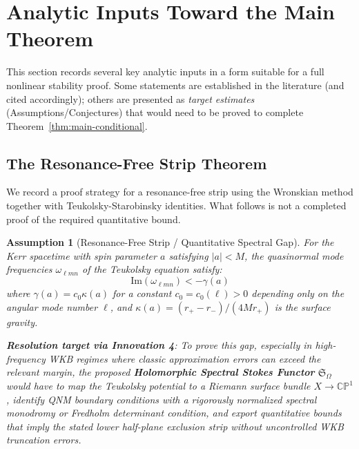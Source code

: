 \documentclass[12pt,a4paper]{article}
\newtheorem{assumption}[theorem]{Assumption}
\begin{document}
\section{Analytic Inputs Toward the Main Theorem}\label{sec:full-proof}

This section records several key analytic inputs in a form suitable for a full nonlinear stability proof. Some statements are established in the literature (and cited accordingly); others are presented as \emph{target estimates} (Assumptions/Conjectures) that would need to be proved to complete Theorem~\ref{thm:main-conditional}.

\subsection{The Resonance-Free Strip Theorem}

We record a proof strategy for a resonance-free strip using the Wronskian method together with Teukolsky-Starobinsky identities. What follows is not a completed proof of the required quantitative bound.

\begin{assumption}[Resonance-Free Strip / Quantitative Spectral Gap]\label{thm:resonance-free}
For the Kerr spacetime with spin parameter $a$ satisfying $|a| < M$, the quasinormal mode frequencies $\omega_{\ell mn}$ of the Teukolsky equation satisfy:
\begin{equation}
\text{Im}(\omega_{\ell mn}) < -\gamma(a)
\end{equation}
where $\gamma(a) = c_0 \kappa(a)$ for a constant $c_0 = c_0(\ell) > 0$ depending only on the angular mode number $\ell$, and $\kappa(a) = (r_+ - r_-)/(4Mr_+)$ is the surface gravity. 

\textbf{Resolution target via Innovation 4}: To prove this gap, especially in high-frequency WKB regimes where classic approximation errors can exceed the relevant margin, the proposed \textbf{Holomorphic Spectral Stokes Functor} $\mathfrak{S}_{\Omega}$ would have to map the Teukolsky potential to a Riemann surface bundle $X \to \mathbb{CP}^1$, identify QNM boundary conditions with a rigorously normalized spectral monodromy or Fredholm determinant condition, and export quantitative bounds that imply the stated lower half-plane exclusion strip without uncontrolled WKB truncation errors.
\end{assumption}
\end{document}
